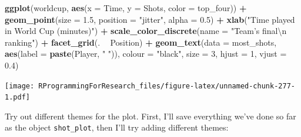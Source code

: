 \documentclass[]{book}
\makeatletter
\newenvironment{Shaded}{\begin{snugshade}}{\end{snugshade}}
\newcommand{\KeywordTok}[1]{\textcolor[rgb]{0.13,0.29,0.53}{\textbf{#1}}}
\newcommand{\DataTypeTok}[1]{\textcolor[rgb]{0.13,0.29,0.53}{#1}}
\newcommand{\DecValTok}[1]{\textcolor[rgb]{0.00,0.00,0.81}{#1}}
\newcommand{\FloatTok}[1]{\textcolor[rgb]{0.00,0.00,0.81}{#1}}
\newcommand{\CharTok}[1]{\textcolor[rgb]{0.31,0.60,0.02}{#1}}
\newcommand{\StringTok}[1]{\textcolor[rgb]{0.31,0.60,0.02}{#1}}
\newcommand{\OperatorTok}[1]{\textcolor[rgb]{0.81,0.36,0.00}{\textbf{#1}}}
\newcommand{\NormalTok}[1]{#1}
\newenvironment{kframe}{%
\medskip{}
\setlength{\fboxsep}{.8em}
 \def\at@end@of@kframe{}%
 \ifinner\ifhmode%
  \def\at@end@of@kframe{\end{minipage}}%
  \begin{minipage}{\columnwidth}%
 \fi\fi%
 \def\FrameCommand##1{\hskip\@totalleftmargin \hskip-\fboxsep
 \colorbox{shadecolor}{##1}\hskip-\fboxsep
     \hskip-\linewidth \hskip-\@totalleftmargin \hskip\columnwidth}%
 \MakeFramed {\advance\hsize-\width
   \@totalleftmargin\z@ \linewidth\hsize
   \@setminipage}}%
 {\par\unskip\endMakeFramed%
 \at@end@of@kframe}
\renewenvironment{Shaded}{\begin{kframe}}{\end{kframe}}
\theoremstyle{definition}
\theoremstyle{definition}
\theoremstyle{definition}
\theoremstyle{remark}
\makeatother
\begin{document}
\begin{Shaded}
\begin{Highlighting}[]
\KeywordTok{ggplot}\NormalTok{(worldcup, }\KeywordTok{aes}\NormalTok{(}\DataTypeTok{x =}\NormalTok{ Time, }\DataTypeTok{y =}\NormalTok{ Shots,}
                     \DataTypeTok{color =}\NormalTok{ top_four)) }\OperatorTok{+}
\StringTok{        }\KeywordTok{geom_point}\NormalTok{(}\DataTypeTok{size =} \FloatTok{1.5}\NormalTok{, }\DataTypeTok{position =} \StringTok{"jitter"}\NormalTok{,}
                   \DataTypeTok{alpha =} \FloatTok{0.5}\NormalTok{)  }\OperatorTok{+}\StringTok{ }
\StringTok{        }\KeywordTok{xlab}\NormalTok{(}\StringTok{"Time played in World Cup (minutes)"}\NormalTok{) }\OperatorTok{+}\StringTok{ }
\StringTok{        }\KeywordTok{scale_color_discrete}\NormalTok{(}\DataTypeTok{name =} \StringTok{"Team's final}\CharTok{\textbackslash{}n}\StringTok{ ranking"}\NormalTok{) }\OperatorTok{+}\StringTok{ }
\StringTok{        }\KeywordTok{facet_grid}\NormalTok{(. }\OperatorTok{~}\StringTok{ }\NormalTok{Position) }\OperatorTok{+}\StringTok{ }
\StringTok{        }\KeywordTok{geom_text}\NormalTok{(}\DataTypeTok{data =}\NormalTok{ most_shots,}
                  \KeywordTok{aes}\NormalTok{(}\DataTypeTok{label =} \KeywordTok{paste}\NormalTok{(Player, }\StringTok{" "}\NormalTok{)),}
                  \DataTypeTok{colour =} \StringTok{"black"}\NormalTok{, }\DataTypeTok{size =} \DecValTok{3}\NormalTok{,}
                  \DataTypeTok{hjust =} \DecValTok{1}\NormalTok{, }\DataTypeTok{vjust =} \FloatTok{0.4}\NormalTok{)}
\end{Highlighting}
\end{Shaded}

\texttt{[image: RProgrammingForResearch\_files/figure-latex/unnamed-chunk-277-1.pdf]}

Try out different themes for the plot. First, I'll save everything we've
done so far as the object \texttt{shot\_plot}, then I'll try adding
different themes:
\end{document}
